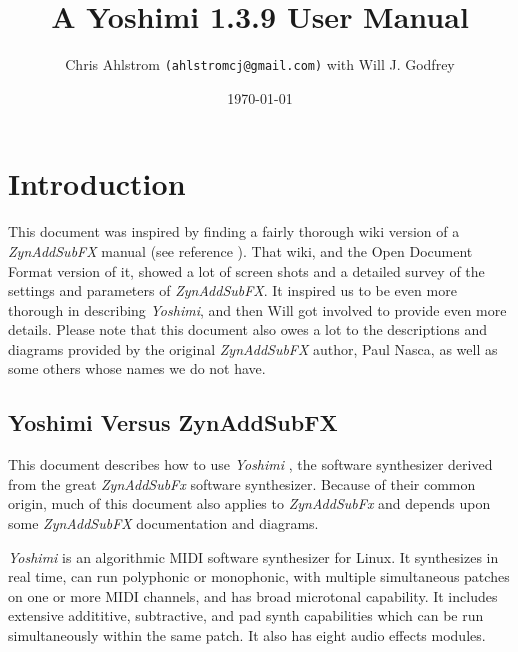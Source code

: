 \documentclass[
 11pt,
 twoside,
 a4paper,
 final                                 %
]{article}
\begin{document}
\title{A Yoshimi 1.3.9 User Manual}
\author{Chris Ahlstrom \texttt{(ahlstromcj@gmail.com)} with Will J. Godfrey}
\date{\today}
\maketitle
\tableofcontents
\listoffigures                         %
\listoftables                          %


\setlength{\parindent}{0pt}
\setlength{\parskip}{1ex plus 0.5ex minus 0.2ex}

\section{Introduction}
\label{sec:introduction}

   This document was inspired by finding a fairly thorough wiki version of a
   \textsl{ZynAddSubFX} manual (see reference \cite{zynwiki}).  That wiki, and
   the Open Document Format version of it, showed a lot of screen shots and a
   detailed survey of the settings and parameters of \textsl{ZynAddSubFX}.  It
   inspired us to be even more thorough in describing \textsl{Yoshimi}, and
   then Will got involved to provide even more details.  Please note that this
   document also owes a lot to the descriptions and diagrams provided by the
   original \textsl{ZynAddSubFX} author, Paul Nasca, as well as some others
   whose names we do not have.

\subsection{Yoshimi Versus ZynAddSubFX}
\label{subsec:introduction_yoshimi_vs_zyn}

   This document describes how to use \textsl{Yoshimi} \cite{yoshimi},
   the software synthesizer derived from the great
   \textsl{ZynAddSubFx} \cite{zynaddsubfx} software
   synthesizer.  Because of their common origin, much of this document also
   applies to \textsl{ZynAddSubFx} and depends upon some \textsl{ZynAddSubFX}
   documentation and diagrams.

   \textsl{Yoshimi} is an algorithmic MIDI software synthesizer for Linux.
   It synthesizes in real time, can run polyphonic or monophonic, with multiple
   simultaneous patches on one or more MIDI channels, and has broad microtonal
   capability. It includes extensive addititive, subtractive,
   and pad synth capabilities which can be run simultaneously within the
   same patch.  It also has eight audio effects modules.
\end{document}
